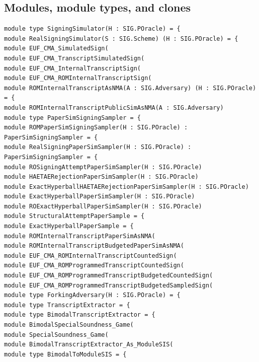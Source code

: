 \subsection*{Modules, module types, and clones}
\begin{lstlisting}[language=EasyCrypt,basicstyle=\ttfamily\tiny]
module type SigningSimulator(H : SIG.POracle) = {
module RealSigningSimulator(S : SIG.Scheme) (H : SIG.POracle) = {
module EUF_CMA_SimulatedSign(
module EUF_CMA_TranscriptSimulatedSign(
module EUF_CMA_InternalTranscriptSign(
module EUF_CMA_ROMInternalTranscriptSign(
module ROMInternalTranscriptAsNMA(A : SIG.Adversary) (H : SIG.POracle) = {
module ROMInternalTranscriptPublicSimAsNMA(A : SIG.Adversary)
module type PaperSimSigningSampler = {
module ROMPaperSimSigningSampler(H : SIG.POracle) : PaperSimSigningSampler = {
module RealSigningPaperSimSampler(H : SIG.POracle) : PaperSimSigningSampler = {
module ROSigningAttemptPaperSimSampler(H : SIG.POracle)
module HAETAERejectionPaperSimSampler(H : SIG.POracle)
module ExactHyperballHAETAERejectionPaperSimSampler(H : SIG.POracle)
module ExactHyperballPaperSimSampler(H : SIG.POracle)
module ROExactHyperballPaperSimSampler(H : SIG.POracle)
module StructuralAttemptPaperSample = {
module ExactHyperballPaperSample = {
module ROMInternalTranscriptPaperSimAsNMA(
module ROMInternalTranscriptBudgetedPaperSimAsNMA(
module EUF_CMA_ROMInternalTranscriptCountedSign(
module EUF_CMA_ROMProgrammedTranscriptCountedSign(
module EUF_CMA_ROMProgrammedTranscriptBudgetedCountedSign(
module EUF_CMA_ROMProgrammedTranscriptBudgetedSampledSign(
module type ForkingAdversary(H : SIG.POracle) = {
module type TranscriptExtractor = {
module type BimodalTranscriptExtractor = {
module BimodalSpecialSoundness_Game(
module SpecialSoundness_Game(
module BimodalTranscriptExtractor_As_ModuleSIS(
module type BimodalToModuleSIS = {
\end{lstlisting}


